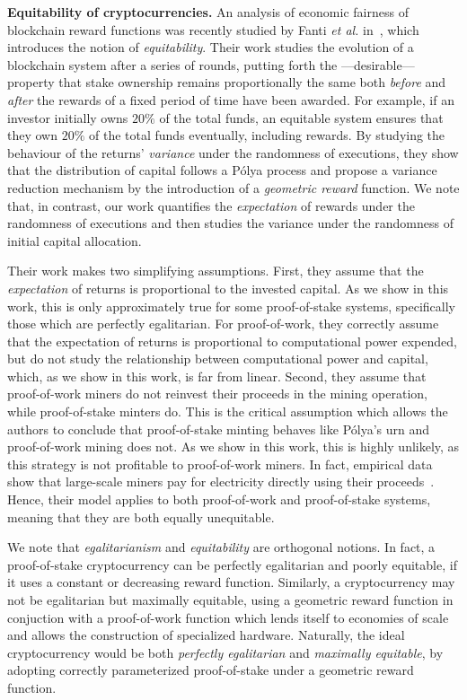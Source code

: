 \noindent\textbf{Equitability of cryptocurrencies.}
An analysis of economic fairness of
blockchain reward functions was recently studied by Fanti \textit{et al.} in~\cite{equitability}, which
introduces the notion of \emph{equitability}. Their work studies the evolution
of a blockchain system after a series of rounds, putting forth the
---desirable--- property that stake ownership remains proportionally the same
both \emph{before} and \emph{after} the rewards of a fixed period of time have been awarded.
For example, if an
investor initially owns $20\%$ of the total funds, an equitable system ensures that they
own $20\%$ of the total funds eventually, \ie including
rewards. By studying the behaviour of the returns' \emph{variance} under the
randomness of executions, they show that the distribution of capital
follows a Pólya process and propose a variance reduction mechanism
by the introduction of a \emph{geometric reward} function.
We note that, in contrast, our work quantifies the \emph{expectation} of rewards
under the randomness of executions and then studies the variance under the
randomness of initial capital allocation.

Their work makes two simplifying assumptions.
First, they assume that the \emph{expectation} of returns is proportional to the
invested capital. As we show in this work, this is only
approximately true for some proof-of-stake systems, specifically those which are perfectly egalitarian. For proof-of-work, they
correctly assume that the expectation of returns is proportional to computational
power expended, but do not study the relationship between computational power and
capital, which, as we show in this work, is far from linear. Second, they assume that
proof-of-work miners do not reinvest their proceeds in the
mining operation, while proof-of-stake minters do. This is the critical assumption which allows the authors to
conclude that proof-of-stake minting behaves like Pólya's urn and
proof-of-work mining does not. As we show in this work, this
is highly unlikely, as this strategy is not profitable to proof-of-work
miners. In fact, empirical data show that large-scale miners pay for electricity
directly using their proceeds~\cite{kharif2018}. Hence, their model applies to both proof-of-work and
proof-of-stake systems, meaning that they are both equally unequitable.

We note that \emph{egalitarianism} and \emph{equitability} are orthogonal
notions. In fact, a proof-of-stake cryptocurrency can be perfectly egalitarian
and poorly equitable, \eg if it uses a constant or decreasing reward function.
Similarly, a cryptocurrency may not be egalitarian but maximally equitable, \eg
using a geometric reward function in conjuction with a proof-of-work function
which lends itself to economies of scale and allows the construction of
specialized hardware. Naturally, the ideal cryptocurrency would be both
\emph{perfectly egalitarian} and \emph{maximally equitable}, \eg by adopting
correctly parameterized proof-of-stake under a geometric reward function.
